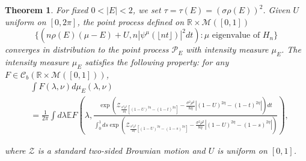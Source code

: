 \documentclass[12pt, reqno]{amsart}
\newtheorem{theorem}{Theorem}[section]
\theoremstyle{definition}
\theoremstyle{remark}
\numberwithin{equation}{section}
\begin{document}
\begin{theorem}\label{newtheorem5.4}
    For fixed $0<|E|<2$, we set $\tau=\tau(E)=(\sigma\rho(E))^2$. Given $U$ uniform on $[0,2\pi]$, the point process defined on $\mathbb{R}\times \mathcal{M}([0,1])$ 
    $$ \{(n\rho(E)(\mu-E)+U,n|\psi^{\mu}(\lfloor nt\rfloor)|^2dt):\mu \text{ eigenvalue of } H_n\}$$
     converges in distribution to the point process $\mathcal{P}_E$ with intensity measure $\mu_E$. The intensity measure $\mu_E$ satisfies the following property: for any $F\in\mathcal{C}_b(\mathbb{R}\times \mathcal{M}([0,1]))$, 
$$\begin{aligned}&\int F(\lambda,\nu)d\mu_E(\lambda,\nu)\\&=\frac{1}{2\pi}\int d\lambda \mathbb{E} F\left(\lambda,\frac{\exp\left(\mathcal{Z}_{\frac{\sigma^2\rho^2}{4\eta}[(1-U)^{2\eta}-(1-t)^{2\eta}]}-\frac{\sigma^2\rho^2}{8\eta}\left|(1-U)^{2\eta}-(1-t)^{2\eta}\right|\right)dt}{\int_0^1 ds \exp\left(\mathcal{Z}_{\frac{\sigma^2\rho^2}{4\eta}[(1-U)^{2\eta}-(1-s)^{2\eta}]}-\frac{\sigma^2\rho^2}{8\eta}\left|(1-U)^{2\eta}-(1-s)^{2\eta}\right|\right)}\right),\end{aligned}$$
     
     where $\mathcal{Z}$ is a standard two-sided Brownian motion and $U$ is uniform on $[0,1]$.
\end{theorem}
 
\end{document}

